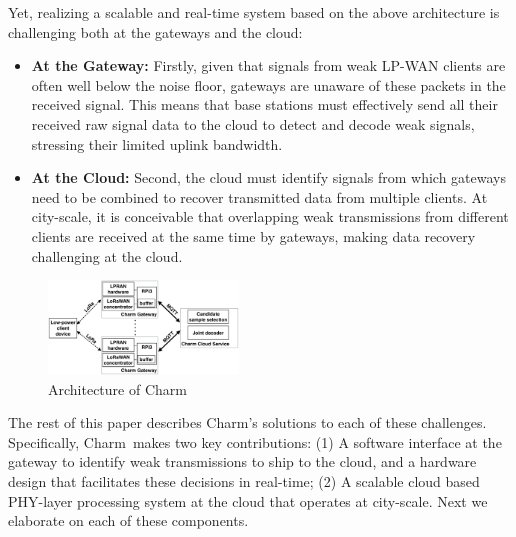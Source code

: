 Yet, realizing a scalable and real-time system based on the above architecture is challenging both at the gateways and the cloud: 
\begin{itemize}
\item {\bf At the Gateway: } Firstly, given that signals from weak LP-WAN clients are often well below the noise floor, gateways are unaware of these packets in the received signal. This means that base stations must effectively send all their received raw signal data to the cloud to detect and decode weak signals, stressing their limited uplink bandwidth. 
\item {\bf At the Cloud: } Second, the cloud must identify signals from which gateways need to be combined to recover transmitted data from multiple clients. At city-scale, it is  conceivable that overlapping weak transmissions from different clients are received at the same time by gateways, making data recovery challenging at the cloud.
\end{itemize}


\begin{figure}[!htb]
    \centering
    \includegraphics[width=0.45\textwidth]{figures/charm-architecture_cropped.pdf}
    \caption{Architecture of Charm}
    \label{fig:architecture}
    \compactimg
\end{figure}


 The rest of this paper describes Charm's solutions to each of these challenges. Specifically, Charm\ makes two key contributions: (1) A software interface at the gateway to identify weak transmissions to ship to the cloud, and a hardware design that facilitates these decisions in real-time; (2) A scalable cloud based PHY-layer processing system at the cloud that operates at city-scale. Next we elaborate on each of these components. 






